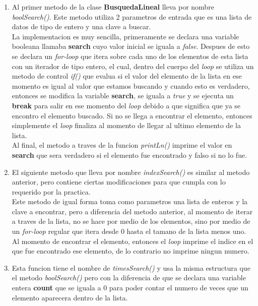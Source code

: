 \documentclass{article}
\begin{document}
				\begin{enumerate}
					\item Al primer metodo de la clase \textbf{BusquedaLineal} lleva por nombre \emph{boolSearch()}. Este metodo utiliza 2 parametros de entrada que es una lista de datos de tipo de entero y una clave a buscar.\\
					
					La implementacion es muy sencilla, primeramente se declara una variable booleana llamaba \textbf{search} cuyo valor inicial se iguala a \emph{false}. Despues de esto se declara un \emph{for-loop} que itera sobre cada uno de los elementos de esta lista con un iterador de tipo entero, el cual, dentro del cuerpo del \emph{loop} se utiliza un metodo de control \emph{if()} que evalua si el valor del elemento de la lista en ese momento es igual al valor que estamos buscando y cuando esto es verdadero, entonces se modifica la variable \textbf{search}, se iguala a \emph{true} y se ejecuta un \textbf{break} para salir en ese momento del \emph{loop} debido a que significa que ya se encontro el elemento buscado. Si no se llega a encontrar el elemento, entonces simplemente el \emph{loop} finaliza al momento de llegar al ultimo elemento de la lista.\\
					
					Al final, el metodo a traves de la funcion \emph{printLn()} imprime el valor en \textbf{search} que sera verdadero si el elemento fue encontrado y falso si no lo fue.\\
					  
					\item El siguiente metodo que lleva por nombre \emph{indexSearch()} es similar al metodo anterior, pero contiene ciertas modificaciones para que cumpla con lo requerido por la practica.\\
					
					Este metodo de igual forma toma como parametros una lista de enteros y la clave a encontrar, pero a diferencia del metodo anterior, al momento de iterar a traves de la lista, no se hace por medio de los elementos, sino por medio de un \emph{for-loop} regular que itera desde 0 hasta el tamano de la lista menos uno.\\
					
					Al momento de encontrar el elemento, entonces el \emph{loop} imprime el indice en el que fue encontrado ese elemento, de lo contrario no imprime ningun numero.\\  
					
					\item Esta funcion tiene el nombre de \emph{timesSearch()} y usa la misma estructura que el metodo \emph{boolSearch()} pero con la diferencia de que se declara una variable entera \textbf{count} que se iguala a 0 para poder contar el numero de veces que un elemento aparecera dentro de la lista.\\
					

\end{enumerate}
\end{document}
